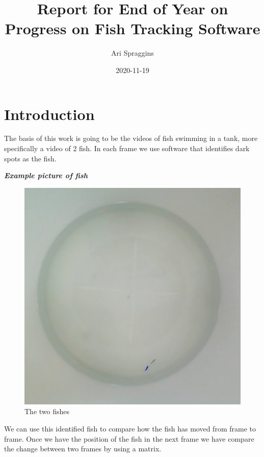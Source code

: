 \documentclass[12pt]{article}
\title{Report for End of Year on Progress on Fish Tracking Software}
\author{Ari Spraggins}
\date{2020-11-19}
\begin{document}
\maketitle
{}

\section{Introduction}

The basis of this work is going to be the videos of fish swimming in a tank, more specifically a video of 2 fish. In each frame we use software that identifies dark spots as the fish.

\textbf{\textit{Example picture of fish}}

\begin{figure}[H]
	\centering
	\includegraphics[width=.75\linewidth]{fish}
	\caption{The two fishes}
	\label{fig:fish}
\end{figure}

We can use this identified fish to compare how the fish has moved from frame to frame. Once we have the position of the fish in the next frame we have compare the change between two frames by using a matrix.
\end{document}
